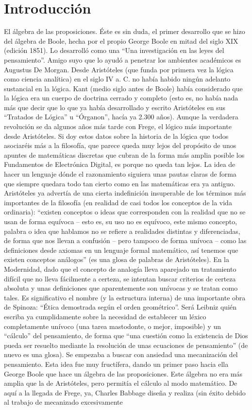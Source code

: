 \chapter{Introducción}
El álgebra de las proposiciones. Éste es sin duda, el primer desarrollo que se hizo del álgebra de Boole, hecha por el propio George Boole en mitad del siglo XIX (edición 1851). Lo desarrolló como una ``Una investigación en las leyes del pensamiento''. Amigo suyo que lo ayudó a penetrar los ambientes académicos es Augustus De Morgan. Desde Aristóteles (que funda por primera vez la lógica como ciencia analítica) en el siglo IV a. C. no había habido ningún adelanto sustancial en la lógica. Kant (medio siglo antes de Boole) había considerado que la lógica era un cuerpo de doctrina cerrado y completo (esto es, no había nada más que decir que lo que ya había desarrollado y escrito Aristóteles en sus ``Tratados de Lógica'' u ``Órganon'', hacía ya 2.300 años). Aunque la verdadera revolución se da algunos años más tarde con Frege, el lógico más importante desde Aristóteles. Si doy estos datos sobre la historia de la lógica que todos asociaréis más a la filosofía, que parece queda muy lejos del propósito de unos apuntes de matemáticas discretas que cubran de la forma más amplia posible los Fundamentos de Electrónica Digital, es porque no queda tan lejos. La idea de hacer un lenguaje dónde el razonamiento siguiera unas pautas claras de forma que siempre quedara todo tan cierto como en las matemáticas era ya antiguo. Aristóteles ya advertía de una cierta indefinición insuperable de los términos más importantes de la filosofía (en realidad de casi todos los conceptos de la vida ordinaria): ``existen conceptos o ideas que corresponden con la realidad que no se usan de forma equívoca -- esto es, su uso no es equívoco, este mismo concepto, palabra o idea que hablamos no se refiere a realidades distintas y diferenciadas, de forma que nos llevan a confusión -- pero tampoco de forma unívoca -- como las definiciones desde axiomas en un lenguaje formal matemático, así tenemos que existen conceptos análogos'' (es una glosa de palabras de Aristóteles). En la Modernidad, dado que el concepto de analogía lleva aparejado un tratamiento difícil que no lleva fácilmente a certeza, se intentan buscar criterios de certeza absoluta y unas definiciones que aparentemente son unívocas y se tratan como tales. Es significativo el nombre (y la estructura interna) de una importante obra de Spinoza: ``Ética demostrada según el orden geométrico''. Será Leibniz quién escriba ya cumplidamente sobre la necesidad de establecer un léxico completamente unívoco (una tarea mastodonte, o mejor, imposible) y un ``cálculo'' del pensamiento, de forma que ``una cuestión como la existencia de Dios pueda ser resuelto mediante la resolución de unas ecuaciones de pensamiento'' (de nuevo es una glosa). Se empezaba a buscar con ansiedad una mecanización del pensamiento. Esta idea fue muy fructífera, dando un primer paso hacia ella George Boole que hace un álgebra de las proposiciones. Este álgebra no era más amplia que la de Aristóteles, pero permitía el cálculo al modo matemático. De aquí a la llegada de Frege, ya, Charles Babbage diseña y realiza (sin éxito debido al trabajo de mecanizado excesivamente 